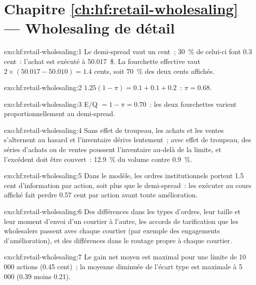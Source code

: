 \section*{Chapitre \ref{ch:hf:retail-wholesaling} --- Wholesaling de détail}

\begin{solution}{exo:hf:retail-wholesaling:1}
Le demi-spread vaut un cent~; 30~\% de celui-ci font 0.3 cent~: l'achat est exécuté à 50.017~\$. La fourchette effective vaut $2\times(50.017-50.010)=1.4$ cents, soit 70~\% des
deux cents affichés.
\end{solution}

\begin{solution}{exo:hf:retail-wholesaling:2}
$1.25(1-\pi)=0.1+0.1+0.2$~: $\pi=0.68$.
\end{solution}

\begin{solution}{exo:hf:retail-wholesaling:3}
E/Q $=1-\pi=0.70$~: les deux fourchettes varient proportionnellement au demi-spread.
\end{solution}

\begin{solution}{exo:hf:retail-wholesaling:4}
Sans effet de troupeau, les achats et les ventes s'alternent au hasard et l'inventaire dérive lentement~; avec effet de troupeau, des séries d'achats ou de ventes poussent l'inventaire au-delà de la limite, et
l'excédent doit être couvert~: 12.9~\% du volume contre 0.9~\%.
\end{solution}

\begin{solution}{exo:hf:retail-wholesaling:5}
Dans le modèle, les ordres institutionnels portent 1.5 cent d'information par action, soit plus que le demi-spread~: les exécuter au cours affiché fait perdre 0.57 cent par
action avant toute amélioration.
\end{solution}

\begin{solution}{exo:hf:retail-wholesaling:6}
Des différences dans les types d'ordres, leur taille et leur moment d'envoi d'un courtier à l'autre, les accords de tarification que les wholesalers passent avec chaque courtier (par exemple des engagements
d'amélioration), et des différences dans le routage propre à chaque courtier.
\end{solution}

\begin{solution}{exo:hf:retail-wholesaling:7}
Le gain net moyen est maximal pour une limite de 10\,000 actions (0.45 cent)~; la moyenne diminuée de l'écart type est maximale à 5\,000 (0.39 moins 0.21).
\end{solution}

